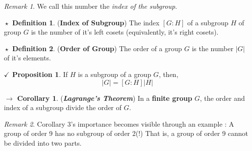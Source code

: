 \documentclass{article}
\theoremstyle{definition}
\newtheorem{definition}{$\boxed{\star}$ Definition}
\theoremstyle{remark}
\newtheorem*{remark}{Remark}
\theoremstyle{definition}
\newtheorem{corollary}{$ \to $ Corollary}
\theoremstyle{definition}
\newtheorem{proposition}{$\checkmark$ Proposition}
\theoremstyle{definition}
\theoremstyle{proof}
\newcommand{\order}[1]{\left\vert #1 \right\vert}
\begin{document}
\begin{remark}
	We call this number the \emph{index of the subgroup}.
\end{remark}
\hrulefill
\begin{definition}
	(\textbf{Index of Subgroup}) The index $ [G:H] $ of a subgroup $ H $ of group $ G $ is the number of it's left cosets (equivalently, it's right cosets).
\end{definition}
\hrulefill
\begin{definition}
	(\textbf{Order of Group}) The order of a group $ G $ is the number $ \order{G} $ of it's elements.
\end{definition}
\hrulefill
\begin{proposition}
	If $ H $ is a subgroup of a group $ G $, then,
	\[\order{G} = [G:H] \order{H}\]
\end{proposition}
\begin{corollary}
	(\textbf{\textit{Lagrange's Theorem}}) In a \textbf{finite group} $ G $, the order and index of a subgroup divide the order of $ G $.
\end{corollary}
\begin{remark}
	Corollary 3's importance becomes visible through an example : A group of order 9 has no subgroup of order 2(!) That is, a group of order 9 cannot be divided into two parts.
\end{remark}
\hrulefill
\newpage
\end{document}
